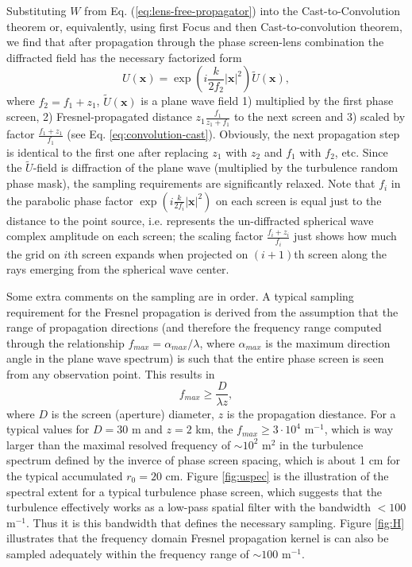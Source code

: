 Substituting $W$ from Eq. (\ref{eq:lens-free-propagator}) into the
Cast-to-Convolution theorem or, equivalently, using first Focus and then
Cast-to-convolution theorem, we find that after propagation through the phase
screen-lens combination the diffracted field has the necessary factorized form
\begin{equation} \label{eq:factorized-field}
  U(\bm{x}) = \exp (i\frac{k}{2 f_{2}} |\bm{x}|^{2}) \tilde{U} (\bm{x}),
\end{equation}
where $f_{2} = f_{1}+z_{1}$, $\tilde{U} (\bm{x})$ is a plane wave field 1)
multiplied by the first phase screen, 2) Fresnel-propagated distance $z_{1}
\frac{f_{1}}{z_{1}+f_{1}}$ to the next screen and 3) scaled by
factor $\frac{f_{1}+z_{1}}{f_{{1}}}$ (see Eq.
\ref{eq:convolution-cast}). Obviously, the next propagation step is
identical to the first one after replacing $z_{1}$ with $z_{2}$ and $f_{1}$
with $f_{2}$, etc. Since the $\tilde{U}$-field is diffraction
of the plane wave (multiplied by the turbulence random phase mask), the
sampling requirements are significantly relaxed. Note that $f_{i}$ in the
parabolic phase
factor $\exp (i\frac{k}{2f_{i}} |\bm{x}|^{2})$ on each screen is equal just to
the distance
to the point source, i.e. represents the un-diffracted spherical wave complex
amplitude on each
screen; the scaling factor $\frac{f_{i}+z_{i}}{f_{i}}$ just shows how much the
grid on $i$th screen expands when projected on $(i+1)$th screen along the rays
emerging from the spherical wave center.

Some extra comments on the sampling are in order. A typical sampling
requirement for the Fresnel propagation \cite{SchmidtProp} is derived from the
assumption that the range of propagation directions (and therefore the
frequency range computed through the relationship $f_{max} =
\alpha_{max}/\lambda$, where $\alpha_{max}$ is the maximum
direction angle in the plane wave spectrum) is such that the entire phase
screen is seen from any observation point. This results in
\begin{equation} \label{eq:classical-Fresnel-sampling}
  f_{max} \geq \frac{D}{\lambda z},
\end{equation}
where $D$ is the screen (aperture) diameter, $z$ is the propagation diestance.
For a typical values for $D = 30$ m and $z = 2$ km, the $f_{max} \geq 3 \cdot
10^{4}$ m$^{-1}$, which is way larger than the maximal resolved frequency of
$\sim 10^{2}$ m$^{2}$ in the turbulence spectrum defined by the inverce of
phase screen spacing, which is about 1 cm for the typical accumulated $r_{0} =
20$ cm. Figure \ref{fig:uspec} is the illustration of the spectral extent for
a typical turbulence phase screen, which suggests that the turbulence
effectively works as a low-pass spatial filter with the bandwidth $< 100$
m$^{-1}$. Thus it is this bandwidth that defines the necessary sampling. Figure
\ref{fig:H} illustrates that the frequency domain Fresnel propagation
kernel is can also be sampled adequately within the frequency range of $\sim
100$ m$^{-1}$.

